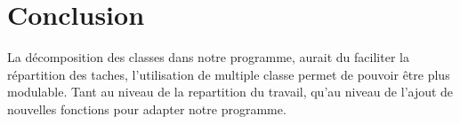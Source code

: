 \documentclass[10pt,a4paper]{article}
\begin{document}
\section*{Conclusion}
La décomposition des classes dans notre programme, aurait du faciliter la répartition des taches, l'utilisation de multiple classe permet de pouvoir être plus modulable. Tant au niveau de la repartition du travail, qu'au niveau de l'ajout de nouvelles fonctions pour adapter notre programme.
\end{document}
